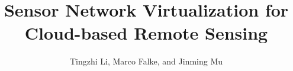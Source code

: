 \documentclass[12pt,journal]{IEEEtran}
\begin{document}
%
\title{Sensor Network Virtualization for Cloud-based Remote Sensing}
%
%
%

\author{Tingzhi Li, Marco Falke, and Jinming Mu}%


% 
%



\end{document}
